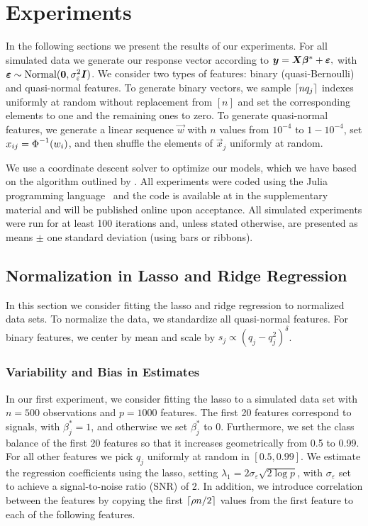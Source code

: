 \section{Experiments}
\label{sec:experiments}

In the following sections we present the results of our experiments. For all simulated data
we generate our response vector according to \(\bm{y} = \bm{X}\bm{\beta}^* +
\bm{\varepsilon},\) with \(\bm{\varepsilon} \sim \operatorname{Normal}(\bm{0}, \sigma_\varepsilon^2
\bm{I})\). We consider two types of features: binary (quasi-Bernoulli) and quasi-normal
features. To generate binary vectors, we sample \(\lceil nq_j \rceil\) indexes uniformly at random
without replacement from \([n]\) and set the corresponding elements to one and the
remaining ones to zero. To generate quasi-normal features, we generate a linear sequence
\(\vec{w}\) with \(n\) values from \(10^{-4}\) to \(1 - 10^{-4}\), set \(x_{ij} =
\operatorname{\Phi}^{-1}(w_i)\), and then shuffle the elements of \(\vec{x}_j\) uniformly at random.

We use a coordinate descent solver to optimize our models, which we have based on the
algorithm outlined by \citet{friedman2010}. All experiments were coded using the Julia
programming language~\citep{bezanson2017} and the code is available at
in the supplementary material and will be published online upon acceptance.
%
All simulated experiments were run for at least 100 iterations and, unless stated
otherwise, are presented as means $\pm$ one standard deviation (using bars or ribbons).

\subsection{Normalization in Lasso and Ridge Regression}%
\label{sec:experiments-lassoridge}

In this section we consider fitting the lasso and ridge regression to normalized data sets.
To normalize the data, we standardize all quasi-normal features. For binary features, we
center by mean and scale by \(s_j \propto (q_j-q_j^2)^\delta\).

\subsubsection{Variability and Bias in Estimates}

In our first experiment, we consider fitting the lasso to a simulated data set with
\(n=500\) observations and \(p = \num{1000}\) features. The first 20 features correspond to
signals, with \(\beta_j^* = 1\), and otherwise we set \(\beta_j^*\) to 0. Furthermore, we
set the class balance of the first 20 features so that it increases geometrically from 0.5
to 0.99. For all other features we pick \(q_j\) uniformly at random in \([0.5,0.99]\). We
estimate the regression coefficients using the lasso, setting \(\lambda_1 = 2
\sigma_\varepsilon \sqrt{2 \log p }\), with \(\sigma_\varepsilon\) set to achieve a
signal-to-noise ratio (SNR) of 2. In addition, we introduce correlation between the
features by copying the first \(\lceil \rho n/2 \rceil\) values from the first feature to each of
the following features.

